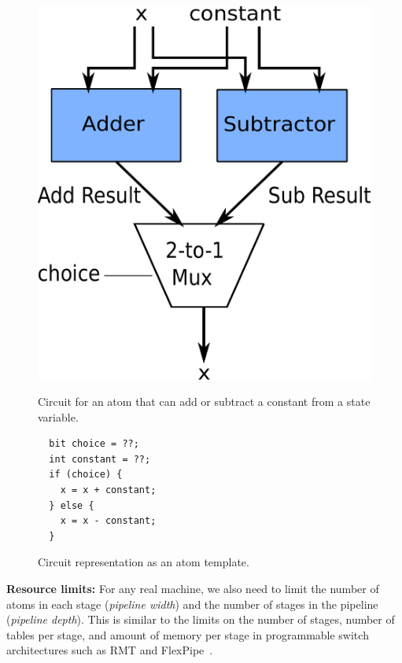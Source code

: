 \begin{figure}[h]
  \begin{minipage}{0.4\columnwidth}
  \begin{center}
  \includegraphics[width=\columnwidth]{circuit.pdf}
  \end{center}
  \caption{Circuit for an atom that can add or subtract a constant from a state variable.}
  \label{fig:alu_diag}
  \end{minipage}
  \hspace{0.05\columnwidth}
  \begin{minipage}{0.55\columnwidth}
  \begin{lstlisting}
  bit choice = ??;
  int constant = ??;
  if (choice) {
    x = x + constant;
  } else {
    x = x - constant;
  }
  \end{lstlisting}
  \caption{Circuit representation as an atom template.}
  \label{fig:alu_in_sketch}
  \end{minipage}
\end{figure}

\textbf{Resource limits:} For any real machine, we also need to limit the
number of atoms in each stage (\textit{pipeline width}) and the number of
stages in the pipeline (\textit{pipeline depth}). This is similar to the limits
on the number of stages, number of tables per stage, and amount of memory per
stage in programmable switch architectures such as RMT and
FlexPipe~\cite{lavanya_compiler}.

